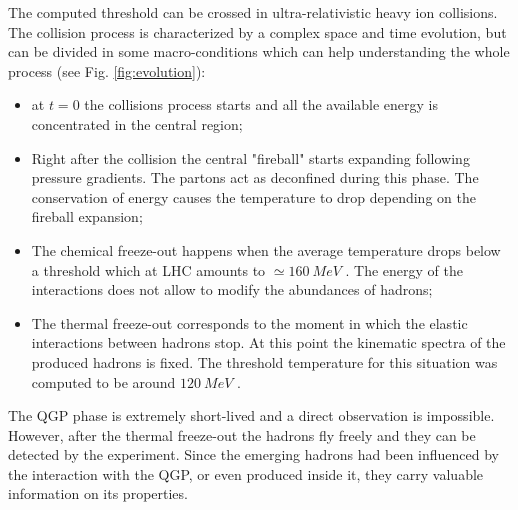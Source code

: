 The computed threshold can be crossed in ultra-relativistic heavy ion collisions.
The collision process is characterized by a complex space and time evolution, but can be divided in some macro-conditions which can help understanding the whole process (see Fig. \ref{fig:evolution}):
\begin{itemize}
    \item at $t=0$ the collisions process starts and all the available energy is concentrated in the central region;
    \item Right after the collision the central "fireball" starts expanding following pressure gradients. The partons act as deconfined during this phase. The conservation of energy causes the temperature to drop depending on the fireball expansion;
    \item The chemical freeze-out happens when the average temperature drops below a threshold which at LHC amounts to $\simeq160\ MeV$ \cite{Kapoyannis:2017hcz}. The energy of the interactions does not allow to modify the abundances of hadrons;
    \item The thermal freeze-out corresponds to the moment in which the elastic interactions between hadrons stop. At this point the kinematic spectra of the produced hadrons is fixed. The threshold temperature for this situation was computed to be around $120\ MeV$ \cite{Mukherjee:2012fb}.
\end{itemize}

The QGP phase is extremely short-lived and a direct observation is impossible.
However, after the thermal freeze-out the hadrons fly freely and they can be detected by the experiment.
Since the emerging hadrons had been influenced by the interaction with the QGP, or even produced inside it, they carry valuable information on its properties.

